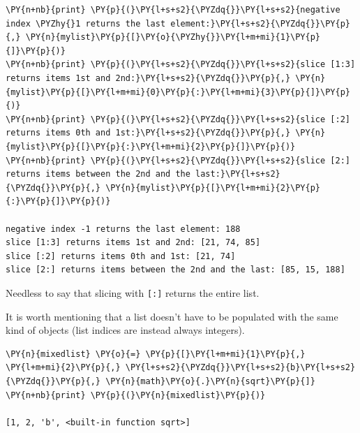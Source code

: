 \begin{tcolorbox}[breakable, size=fbox, boxrule=1pt, pad at break*=1mm, colback=cellbackground, colframe=cellborder]
\begin{Verbatim}[commandchars=\\\{\}]
\PY{n+nb}{print} \PY{p}{(}\PY{l+s+s2}{\PYZdq{}}\PY{l+s+s2}{negative index \PYZhy{}1 returns the last element:}\PY{l+s+s2}{\PYZdq{}}\PY{p}{,} \PY{n}{mylist}\PY{p}{[}\PY{o}{\PYZhy{}}\PY{l+m+mi}{1}\PY{p}{]}\PY{p}{)}
\PY{n+nb}{print} \PY{p}{(}\PY{l+s+s2}{\PYZdq{}}\PY{l+s+s2}{slice [1:3] returns items 1st and 2nd:}\PY{l+s+s2}{\PYZdq{}}\PY{p}{,} \PY{n}{mylist}\PY{p}{[}\PY{l+m+mi}{0}\PY{p}{:}\PY{l+m+mi}{3}\PY{p}{]}\PY{p}{)}
\PY{n+nb}{print} \PY{p}{(}\PY{l+s+s2}{\PYZdq{}}\PY{l+s+s2}{slice [:2] returns items 0th and 1st:}\PY{l+s+s2}{\PYZdq{}}\PY{p}{,} \PY{n}{mylist}\PY{p}{[}\PY{p}{:}\PY{l+m+mi}{2}\PY{p}{]}\PY{p}{)}
\PY{n+nb}{print} \PY{p}{(}\PY{l+s+s2}{\PYZdq{}}\PY{l+s+s2}{slice [2:] returns items between the 2nd and the last:}\PY{l+s+s2}{\PYZdq{}}\PY{p}{,} \PY{n}{mylist}\PY{p}{[}\PY{l+m+mi}{2}\PY{p}{:}\PY{p}{]}\PY{p}{)}

negative index -1 returns the last element: 188
slice [1:3] returns items 1st and 2nd: [21, 74, 85]
slice [:2] returns items 0th and 1st: [21, 74]
slice [2:] returns items between the 2nd and the last: [85, 15, 188]
\end{Verbatim}
\end{tcolorbox}
\noindent
Needless to say that slicing with \texttt{[:]} returns the entire list.

It is worth mentioning that a list doesn't have to be populated
with the same kind of objects (list indices are instead always
integers).

\begin{tcolorbox}[breakable, size=fbox, boxrule=1pt, pad at break*=1mm, colback=cellbackground, colframe=cellborder]
\begin{Verbatim}[commandchars=\\\{\}]
\PY{n}{mixedlist} \PY{o}{=} \PY{p}{[}\PY{l+m+mi}{1}\PY{p}{,} \PY{l+m+mi}{2}\PY{p}{,} \PY{l+s+s2}{\PYZdq{}}\PY{l+s+s2}{b}\PY{l+s+s2}{\PYZdq{}}\PY{p}{,} \PY{n}{math}\PY{o}{.}\PY{n}{sqrt}\PY{p}{]}
\PY{n+nb}{print} \PY{p}{(}\PY{n}{mixedlist}\PY{p}{)}

[1, 2, 'b', <built-in function sqrt>]
\end{Verbatim}
\end{tcolorbox}

